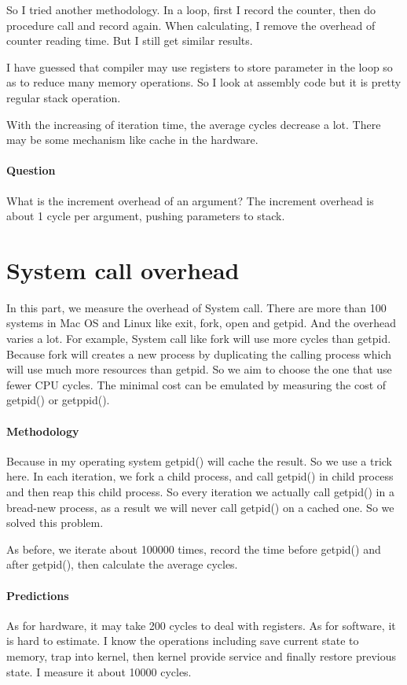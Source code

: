 So I tried another methodology. In a loop, first I record the counter, then do procedure call and record again. When calculating, I remove the overhead of counter reading time. But I still get similar results.

I have guessed that compiler may use registers to store parameter in the loop so as to reduce many memory operations. So I look at assembly code but it is pretty regular stack operation.

With the increasing of iteration time, the average cycles decrease a lot. There may be some mechanism like cache in the hardware.

\paragraph{Question} What is the increment overhead of an argument? The increment overhead is about 1 cycle per  argument, pushing parameters to stack.

\section{System call overhead}
In this part, we measure the overhead of System call. There are more than 100 systems in Mac OS and Linux like exit, fork, open and getpid. And the overhead varies a lot. For example, System call like fork will use more cycles than getpid. Because fork will creates a new process by duplicating the calling process which will use much more resources than getpid. So we aim to choose the one that use fewer CPU cycles. The minimal cost can be emulated by measuring the cost of getpid() or getppid().

\paragraph{Methodology}
Because in my operating system getpid() will cache the result. So we use a trick here. In each iteration, we fork a child process, and call getpid() in child process and then reap this child process. So every iteration we actually call getpid() in a bread-new  process, as a result we will never call getpid() on a cached one. So we solved this problem.

As before, we iterate about 100000 times, record the time before getpid() and after getpid(), then calculate the average cycles.

\paragraph{Predictions}
As for hardware, it may take 200 cycles to deal with registers. As for software, it is hard to estimate.  I know the operations including save current state to memory, trap into kernel, then kernel provide service and finally restore previous state. I measure it about 10000 cycles.

